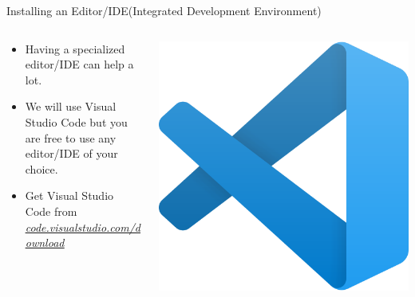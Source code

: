     \begin{frame}[t]{Installing an Editor/IDE(Integrated Development Environment)}
        \vspace{-4mm}
        \begin{columns}[t] 
            \begin{column}[t]{0.66\linewidth}
                \LARGE
                \begin{itemize}
                    \item Having a specialized editor/IDE can help a lot. 
                    \item We will use Visual Studio Code but you are free to use any editor/IDE of your choice.
                    \item Get Visual Studio Code from \href{https://code.visualstudio.com/download}{\underline{\textit{code.visualstudio.com/download}}}
                \end{itemize}
            \end{column}
            
            \begin{column}{0.33\linewidth}
                \begin{center}
                    \includegraphics[width=0.8\linewidth]{images/vscode_icon.png}						
                \end{center}
            \end{column}
        \end{columns}
     \end{frame}

